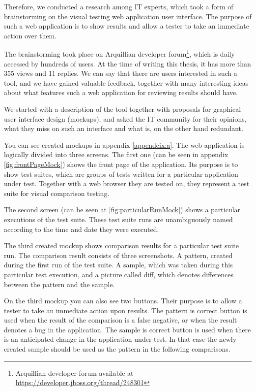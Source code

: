 \documentclass[11pt,oneside,final]{fithesis2}
\begin{document}
  Therefore, we conducted a research among IT experts, which took a form of brainstorming on the visual testing web application user interface. The purpose of such a web application is to show
  results and allow a tester to take an immediate action over them.
  
  The brainstorming took place on Arquillian developer forum\footnote{Arquillian developer forum available at \url{https://developer.jboss.org/thread/248301}}, which is daily accessed by hundreds of users. At the time of writing this thesis, it has more than 355 views 
  and 11 replies. We can say that there are users interested in such a tool, and we have gained valuable feedback, together with many interesting ideas about what features such a web application
  for reviewing results should have.
  
  We started with a description of the tool together with proposals for graphical user interface design (mockups), and asked the IT community for their
  opinions, what they miss on such an interface and what is, on the other hand redundant.
  
  You can see created mockups in appendix \ref{appendeix:a}. The web application is logically divided into
  three screens. The first one (can be seen in appendix \ref{fig:frontPageMock}) shows the front page of the application. Its purpose
  is to show test suites, which are groups of tests written for a particular application under test.
  Together with a web browser they are tested on, they represent a test suite for visual comparison testing.
  
  The second screen (can be seen at \ref{fig:particularRunMock}) shows a particular executions of the test suite. These test
  suite runs are unambiguously named according to the time and date they were executed.
  
  The third created mockup shows comparison results for a particular test suite run. The comparison result
  consists of three screenshots. A pattern, created during the first run of the test suite. A sample, which
  was taken during this particular test execution, and a picture called diff, which denotes differences
  between the pattern and the sample.
  
  On the third mockup you can also see two buttons. Their purpose is to allow a tester to take an immediate
  action upon results. The pattern is correct button is used when the result of the comparison is
  a false negative, or when the result denotes a bug in the application. The sample is correct button is used
  when there is an anticipated change in the application under test. 
  In that case the newly created sample should be used as the pattern in the following comparisons.
  
\end{document}
